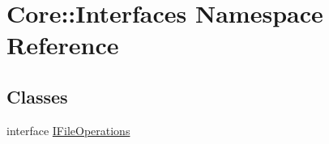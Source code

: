 \hypertarget{namespace_core_1_1_interfaces}{
\section{Core::Interfaces Namespace Reference}
\label{namespace_core_1_1_interfaces}
}
\subsection*{Classes}
\begin{DoxyCompactItemize}
\item 
interface \hyperlink{interface_core_1_1_interfaces_1_1_i_file_operations}{IFileOperations}
\end{DoxyCompactItemize}
